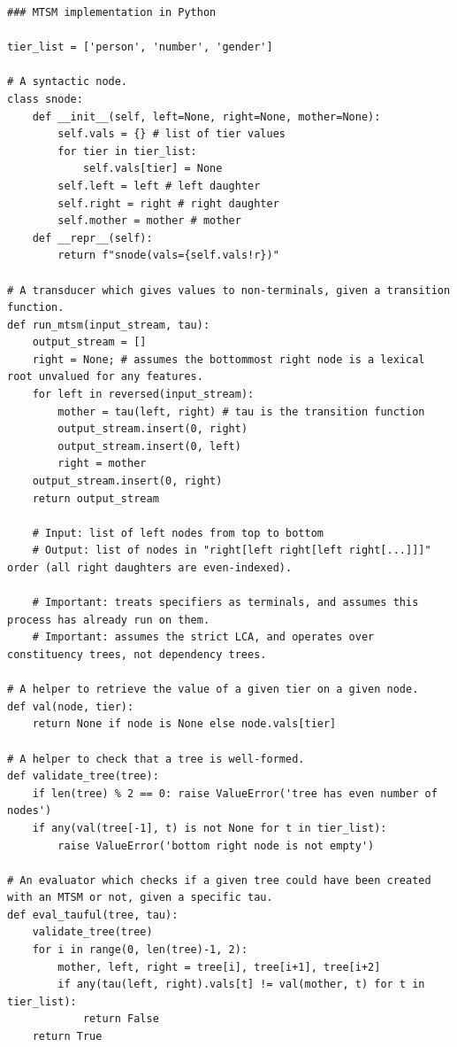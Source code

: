 
\begin{verbatim}
### MTSM implementation in Python

tier_list = ['person', 'number', 'gender'] 

# A syntactic node. 
class snode:
    def __init__(self, left=None, right=None, mother=None):
        self.vals = {} # list of tier values
        for tier in tier_list:
            self.vals[tier] = None
        self.left = left # left daughter
        self.right = right # right daughter
        self.mother = mother # mother
    def __repr__(self):
        return f"snode(vals={self.vals!r})"

# A transducer which gives values to non-terminals, given a transition function. 
def run_mtsm(input_stream, tau):
    output_stream = []
    right = None; # assumes the bottommost right node is a lexical root unvalued for any features.
    for left in reversed(input_stream):
        mother = tau(left, right) # tau is the transition function
        output_stream.insert(0, right)
        output_stream.insert(0, left)
        right = mother
    output_stream.insert(0, right)
    return output_stream

    # Input: list of left nodes from top to bottom
    # Output: list of nodes in "right[left right[left right[...]]]" order (all right daughters are even-indexed). 

    # Important: treats specifiers as terminals, and assumes this process has already run on them. 
    # Important: assumes the strict LCA, and operates over constituency trees, not dependency trees.

# A helper to retrieve the value of a given tier on a given node. 
def val(node, tier):
    return None if node is None else node.vals[tier]

# A helper to check that a tree is well-formed. 
def validate_tree(tree):
    if len(tree) % 2 == 0: raise ValueError('tree has even number of nodes')
    if any(val(tree[-1], t) is not None for t in tier_list):
        raise ValueError('bottom right node is not empty')

# An evaluator which checks if a given tree could have been created with an MTSM or not, given a specific tau. 
def eval_tauful(tree, tau):
    validate_tree(tree)
    for i in range(0, len(tree)-1, 2):
        mother, left, right = tree[i], tree[i+1], tree[i+2]
        if any(tau(left, right).vals[t] != val(mother, t) for t in tier_list):
            return False
    return True


\end{verbatim}
